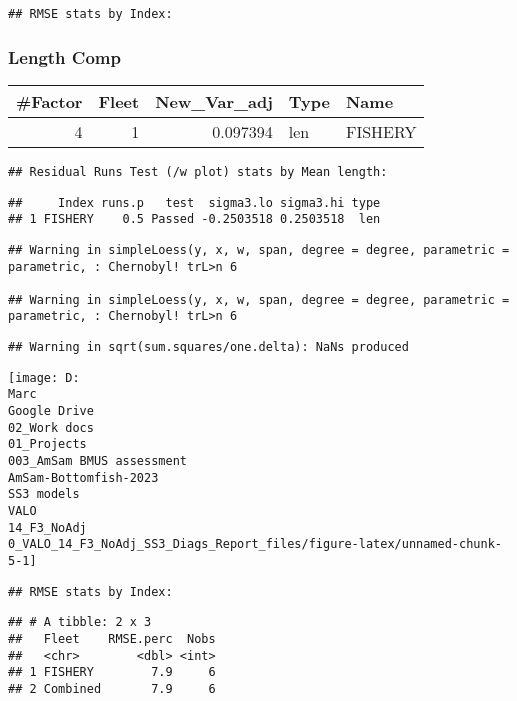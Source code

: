 \documentclass[
]{article}
\begin{document}
\begin{verbatim}
## RMSE stats by Index:
\end{verbatim}

\hypertarget{length-comp}{%
\subsubsection{Length Comp}\label{length-comp}}

\captionsetup[table]{labelformat=empty,skip=1pt}
\begin{longtable}{rrrll}
\toprule
\#Factor & Fleet & New\_Var\_adj & Type & Name \\ 
\midrule
4 & 1 & 0.097394 & len & FISHERY \\ 
\bottomrule
\end{longtable}

\begin{verbatim}
## Residual Runs Test (/w plot) stats by Mean length:
\end{verbatim}

\begin{verbatim}
##     Index runs.p   test  sigma3.lo sigma3.hi type
## 1 FISHERY    0.5 Passed -0.2503518 0.2503518  len
\end{verbatim}

\begin{verbatim}
## Warning in simpleLoess(y, x, w, span, degree = degree, parametric = parametric, : Chernobyl! trL>n 6

## Warning in simpleLoess(y, x, w, span, degree = degree, parametric = parametric, : Chernobyl! trL>n 6
\end{verbatim}

\begin{verbatim}
## Warning in sqrt(sum.squares/one.delta): NaNs produced
\end{verbatim}

\begin{center}\texttt{[image: D:\\Marc\\Google Drive\\02\_Work docs\\01\_Projects\\003\_AmSam BMUS assessment\\AmSam-Bottomfish-2023\\SS3 models\\VALO\\14\_F3\_NoAdj\\0\_VALO\_14\_F3\_NoAdj\_SS3\_Diags\_Report\_files/figure-latex/unnamed-chunk-5-1]} \end{center}

\begin{verbatim}
## RMSE stats by Index:
\end{verbatim}

\begin{verbatim}
## # A tibble: 2 x 3
##   Fleet    RMSE.perc  Nobs
##   <chr>        <dbl> <int>
## 1 FISHERY        7.9     6
## 2 Combined       7.9     6
\end{verbatim}
\end{document}

